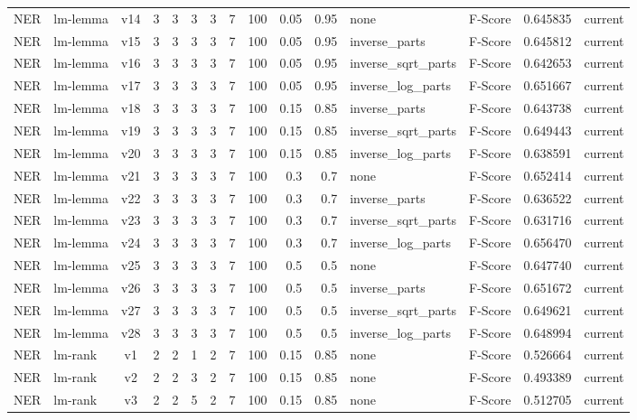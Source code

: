 \documentclass{article}
\begin{document}
\begin{xltabular}{\linewidth}{@{}lYcrrrrrrrrYlrl@{}}
NER & lm-lemma & v14 & 3 & 3 & 3 & 3 & 7 & 100 & 0.05 & 0.95 & none & F-Score & 0.645835 & current \\
NER & lm-lemma & v15 & 3 & 3 & 3 & 3 & 7 & 100 & 0.05 & 0.95 & inverse\_parts & F-Score & 0.645812 & current \\
NER & lm-lemma & v16 & 3 & 3 & 3 & 3 & 7 & 100 & 0.05 & 0.95 & inverse\_sqrt\_parts & F-Score & 0.642653 & current \\
NER & lm-lemma & v17 & 3 & 3 & 3 & 3 & 7 & 100 & 0.05 & 0.95 & inverse\_log\_parts & F-Score & 0.651667 & current \\
NER & lm-lemma & v18 & 3 & 3 & 3 & 3 & 7 & 100 & 0.15 & 0.85 & inverse\_parts & F-Score & 0.643738 & current \\
NER & lm-lemma & v19 & 3 & 3 & 3 & 3 & 7 & 100 & 0.15 & 0.85 & inverse\_sqrt\_parts & F-Score & 0.649443 & current \\
NER & lm-lemma & v20 & 3 & 3 & 3 & 3 & 7 & 100 & 0.15 & 0.85 & inverse\_log\_parts & F-Score & 0.638591 & current \\
NER & lm-lemma & v21 & 3 & 3 & 3 & 3 & 7 & 100 & 0.3 & 0.7 & none & F-Score & 0.652414 & current \\
NER & lm-lemma & v22 & 3 & 3 & 3 & 3 & 7 & 100 & 0.3 & 0.7 & inverse\_parts & F-Score & 0.636522 & current \\
NER & lm-lemma & v23 & 3 & 3 & 3 & 3 & 7 & 100 & 0.3 & 0.7 & inverse\_sqrt\_parts & F-Score & 0.631716 & current \\
NER & lm-lemma & v24 & 3 & 3 & 3 & 3 & 7 & 100 & 0.3 & 0.7 & inverse\_log\_parts & F-Score & 0.656470 & current \\
NER & lm-lemma & v25 & 3 & 3 & 3 & 3 & 7 & 100 & 0.5 & 0.5 & none & F-Score & 0.647740 & current \\
NER & lm-lemma & v26 & 3 & 3 & 3 & 3 & 7 & 100 & 0.5 & 0.5 & inverse\_parts & F-Score & 0.651672 & current \\
NER & lm-lemma & v27 & 3 & 3 & 3 & 3 & 7 & 100 & 0.5 & 0.5 & inverse\_sqrt\_parts & F-Score & 0.649621 & current \\
NER & lm-lemma & v28 & 3 & 3 & 3 & 3 & 7 & 100 & 0.5 & 0.5 & inverse\_log\_parts & F-Score & 0.648994 & current \\
NER & lm-rank & v1 & 2 & 2 & 1 & 2 & 7 & 100 & 0.15 & 0.85 & none & F-Score & 0.526664 & current \\
NER & lm-rank & v2 & 2 & 2 & 3 & 2 & 7 & 100 & 0.15 & 0.85 & none & F-Score & 0.493389 & current \\
NER & lm-rank & v3 & 2 & 2 & 5 & 2 & 7 & 100 & 0.15 & 0.85 & none & F-Score & 0.512705 & current \\

\end{xltabular}
\end{document}
